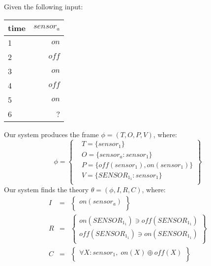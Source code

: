 
Given the following input:
\begin{table}[ht!]
\begin{center}
\begin{tabular}{|l|r|}
\hline
time & $\mathit{sensor}_a$\\
\hline
1 & $\mathit{on}$ \\
2 & $\mathit{off}$ \\
3 & $\mathit{on}$ \\
4 & $\mathit{off}$ \\
5 & $\mathit{on}$ \\
6 & ? \\
\hline
\end{tabular}
\end{center}
\end{table}

Our system produces the frame $\phi = (T, O, P, V)$, where:
\begin{equation*}
\phi = \left \{
\begin{aligned}
& T = \{ 
sensor_1
\}\\
& O = \{
\mathit{sensor}_a: sensor_1
\}\\
& P = \{
\mathit{off}(sensor_1),\mathit{on}(sensor_1)
\}\\
& V = \{
SENSOR_1_1: sensor_1
\}\\
\end{aligned}\right\}
\end{equation*}
Our system finds the theory $\theta = (\phi, I, R, C)$, where:
\begin{eqnarray*}
I & = & \left\{ \begin{array}{l}
\mathit{on}(\mathit{sensor}_a)\\
\end{array}\right\}\\
R & = &  \left\{ \begin{array}{l}
\mathit{on}(\mathit{SENSOR}_1_1) \ni \mathit{off}(\mathit{SENSOR}_1_1)\\
\mathit{off}(\mathit{SENSOR}_1_1) \ni \mathit{on}(\mathit{SENSOR}_1_1)\\
\end{array}\right\}\\
C & = & \left\{ \begin{array}{l}
\forall X : sensor_1,\;\mathit{on}(X) \oplus \mathit{off}(X)\\
\end{array}\right\}\\
\end{eqnarray*}

